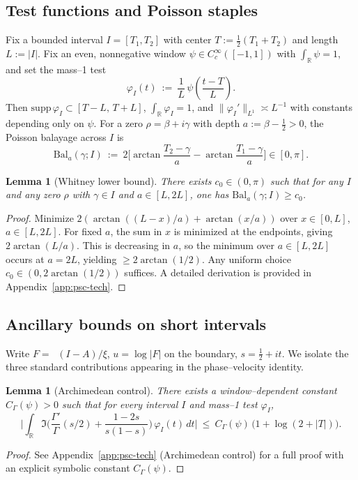 \documentclass[11pt]{article}
\newtheorem{lemma}[theorem]{Lemma}
\theoremstyle{definition}
\theoremstyle{remark}
\newcommand{\R}{\mathbb{R}}
\DeclareMathOperator{\dettwo}{det_2}
\begin{document}
\subsection{Test functions and Poisson staples}
Fix a bounded interval \(I=[T_1,T_2]\) with center \(T:=\tfrac12(T_1+T_2)\) and length \(L:=|I|\). Fix an even, nonnegative window \(\psi\in C_c^\infty([-1,1])\) with \(\int_\R\psi=1\), and set the mass–1 test
\[
  \varphi_I(t)\ :=\ \frac{1}{L}\,\psi\!\left(\frac{t-T}{L}\right).
\]
Then \(\mathrm{supp}\,\varphi_I\subset[T-L,\,T+L]\), \(\int_\R \varphi_I=1\), and \(\|\varphi_I'\|_{L^1}\asymp L^{-1}\) with constants depending only on \(\psi\).
For a zero \(\rho=\beta+i\gamma\) with depth \(a:=\beta-\tfrac12>0\), the Poisson balayage across \(I\) is
\[ \mathrm{Bal}_a(\gamma;I)\ :=\ 2\Big[\arctan\!\frac{T_2-\gamma}{a}-\arctan\!\frac{T_1-\gamma}{a}\Big] \in [0,\pi].\]

\begin{lemma}[Whitney lower bound]\label{lem:whitney-lower}
There exists \(c_0\in(0,\pi)\) such that for any \(I\) and any zero \(\rho\) with \(\gamma\in I\) and \(a\in[L,2L]\), one has \(\mathrm{Bal}_a(\gamma;I)\ge c_0\).
\end{lemma}
\begin{proof}
Minimize \(2(\arctan((L-x)/a)+\arctan(x/a))\) over \(x\in[0,L]\), \(a\in[L,2L]\). For fixed \(a\), the sum in \(x\) is minimized at the endpoints, giving \(2\arctan(L/a)\). This is decreasing in \(a\), so the minimum over \(a\in[L,2L]\) occurs at \(a=2L\), yielding \(\ge 2\arctan(1/2)\). Any uniform choice \(c_0\in(0,2\arctan(1/2))\) suffices. A detailed derivation is provided in Appendix~\ref{app:psc-tech}.
\end{proof}

\subsection{Ancillary bounds on short intervals}
Write \(F=\dettwo(I-A)/\xi\), \(u=\log|F|\) on the boundary, \(s=\tfrac12+it\). We isolate the three standard contributions appearing in the phase--velocity identity.

\begin{lemma}[Archimedean control]\label{lem:arch}
There exists a window–dependent constant \(C_\Gamma(\psi)>0\) such that for every interval \(I\) and mass–1 test \(\varphi_I\),
\[ \Big|\int_{\R} \Im\Big(\frac{\Gamma'}{\Gamma}(s/2)+\frac{1-2s}{s(1-s)}\Big)\,\varphi_I(t)\,dt\Big|\ \le\ C_\Gamma(\psi)\,\big(1+\log(2+|T|)\big).\]
\end{lemma}
\begin{proof}
See Appendix~\ref{app:psc-tech} (Archimedean control) for a full proof with an explicit symbolic constant \(C_\Gamma(\psi)\).
\end{proof}
\end{document}
